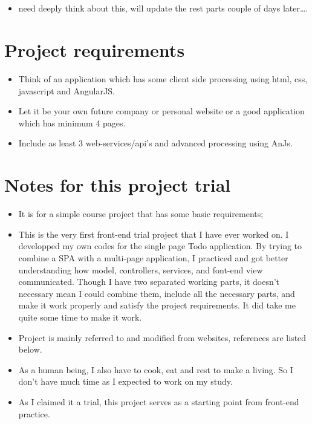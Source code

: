 \documentclass[9pt,b5paper]{article}
\begin{document}
\subsection{}
\label{sec-12-5}
\begin{itemize}
\item need deeply think about this, will update the rest parts couple of days later\ldots{}.
\end{itemize}


\section{Project requirements}
\label{sec-13}
\begin{itemize}
\item Think of an application which has some client side processing using html, css, javascript and AngularJS.
\item Let it be your own future company or personal website or a good application which has minimum 4 pages.
\item Include as least 3 web-services/api's and advanced processing using AnJs.
\end{itemize}

\section{Notes for this project trial}
\label{sec-14}
\begin{itemize}
\item It is for a simple course project that has some basic requirements;
\item This is the very first front-end trial project that I have ever worked on. I developped my own codes for the single page Todo application. By trying to combine a SPA with a multi-page application, I practiced and got better understanding how model, controllers, services, and font-end view communicated. Though I have two separated working parts, it doesn't necessary mean I could combine them, include all the necessary parts, and make it work properly and satisfy the project requirements. It did take me quite some time to make it work.
\item Project is mainly referred to and modified from websites, references are listed below.
\item As a human being, I also have to cook, eat and rest to make a living. So I don't have much time as I expected to work on my study.
\item As I claimed it a trial, this project serves as a starting point from front-end practice.
\end{itemize}
\end{document}
